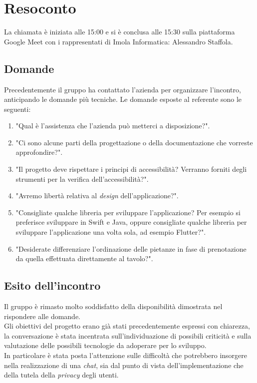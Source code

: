 \section{Resoconto}
La chiamata è iniziata alle 15:00 e si è conclusa alle 15:30 sulla piattaforma Google Meet con i rappresentati di Imola Informatica: Alessandro Staffola. \\

\subsection{Domande}
Precedentemente il gruppo ha contattato l'azienda per organizzare l'incontro, anticipando le domande più tecniche.
Le domande esposte al referente sono le seguenti:
\begin{enumerate}
	\item "Qual è l'assistenza che l'azienda può metterci a disposizione?".
	\item "Ci sono alcune parti della progettazione o della documentazione che vorreste approfondire?".
	\item "Il progetto deve rispettare i principi di accessibilità? Verranno forniti degli strumenti per la verifica dell'accessibilità?".
	\item "Avremo libertà relativa al \textit{design} dell'applicazione?".
	\item "Consigliate qualche libreria per sviluppare l'applicazione? Per esempio si preferisce sviluppare in Swift e Java, oppure consigliate qualche libreria per sviluppare l'applicazione una volta sola, ad esempio Flutter?".
	\item "Desiderate differenziare l'ordinazione delle pietanze in fase di prenotazione da quella effettuata direttamente al tavolo?".
\end{enumerate}

\subsection{Esito dell'incontro}
Il gruppo è rimasto molto soddisfatto della disponibilità dimostrata nel rispondere alle domande. \\
Gli obiettivi del progetto erano già stati precedentemente espressi con chiarezza, la conversazione è stata incentrata sull'individuazione di possibili criticità e sulla valutazione delle possibili tecnologie da adoperare per lo sviluppo. \\
In particolare è stata posta l'attenzione sulle difficoltà che potrebbero insorgere nella realizzazione di una \textit{chat}, sia dal punto di vista dell'implementazione che della tutela della \textit{privacy} degli utenti.

